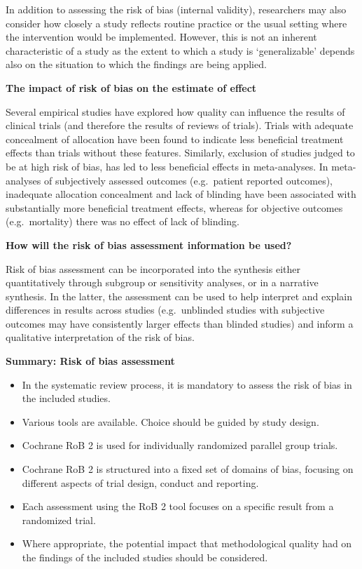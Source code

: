 \documentclass[
  10pt,
  a4paper,
  DIV=11,
  numbers=noendperiod]{scrreprt}
\begin{document}
In addition to assessing the risk of bias (internal validity),
researchers may also consider how closely a study reflects routine
practice or the usual setting where the intervention would be
implemented. However, this is not an inherent characteristic of a study
as the extent to which a study is `generalizable' depends also on the
situation to which the findings are being applied.

\textbf{The impact of risk of bias on the estimate of effect}

Several empirical studies have explored how quality can influence the
results of clinical trials (and therefore the results of reviews of
trials). Trials with adequate concealment of allocation have been found
to indicate less beneficial treatment effects than trials without these
features. Similarly, exclusion of studies judged to be at high risk of
bias, has led to less beneficial effects in meta-analyses. In
meta-analyses of subjectively assessed outcomes (e.g.~patient reported
outcomes), inadequate allocation concealment and lack of blinding have
been associated with substantially more beneficial treatment effects,
whereas for objective outcomes (e.g.~mortality) there was no effect of
lack of blinding.

\textbf{How will the risk of bias assessment information be used?}

Risk of bias assessment can be incorporated into the synthesis either
quantitatively through subgroup or sensitivity analyses, or in a
narrative synthesis. In the latter, the assessment can be used to help
interpret and explain differences in results across studies
(e.g.~unblinded studies with subjective outcomes may have consistently
larger effects than blinded studies) and inform a qualitative
interpretation of the risk of bias.

\textbf{Summary: Risk of bias assessment}

\begin{itemize}
\item
  In the systematic review process, it is mandatory to assess the risk
  of bias in the included studies.
\item
  Various tools are available. Choice should be guided by study design.
\item
  Cochrane RoB 2 is used for individually randomized parallel group
  trials.
\item
  Cochrane RoB 2 is structured into a fixed set of domains of bias,
  focusing on different aspects of trial design, conduct and reporting.
\item
  Each assessment using the RoB 2 tool focuses on a specific result from
  a randomized trial.
\item
  Where appropriate, the potential impact that methodological quality
  had on the findings of the included studies should be considered.
\end{itemize}
\end{document}
